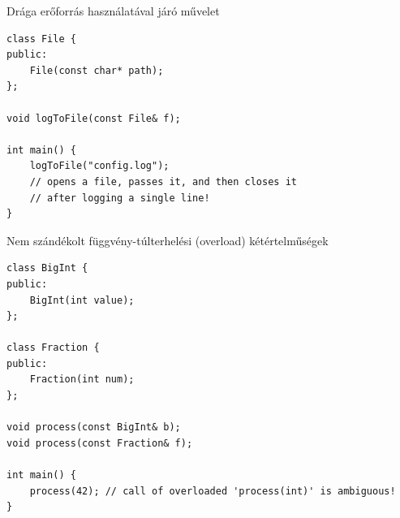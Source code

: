 \documentclass[usenames,dvipsnames,aspectratio=169]{beamer}
\begin{document}
\begin{frame}[fragile]
    \begin{alertblock}{Drága erőforrás használatával járó művelet}
        \vspace{-.2cm}
        \begin{verbatim}
class File {
public:
    File(const char* path);
};

void logToFile(const File& f);

int main() {
    logToFile("config.log"); 
    // opens a file, passes it, and then closes it 
    // after logging a single line!
}
\end{verbatim}
    \vspace{-.2cm}
    \end{alertblock}
\end{frame}

\begin{frame}[fragile]
    \begin{alertblock}{Nem szándékolt függvény-túlterhelési (overload) kétértelműségek}
        \scriptsize
        \vspace{-.2cm}
        \begin{verbatim}
class BigInt {
public:
    BigInt(int value); 
};

class Fraction {
public:
    Fraction(int num);
};

void process(const BigInt& b);
void process(const Fraction& f);

int main() {
    process(42); // call of overloaded 'process(int)' is ambiguous!
}
\end{verbatim}
    \vspace{-.2cm}
    \end{alertblock}
\end{frame}
\end{document}
